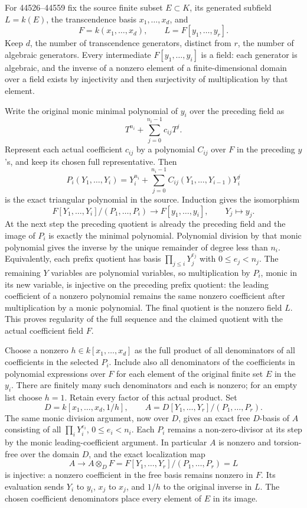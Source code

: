 For 44526--44559 fix the source finite subset \(E\subset K\), its generated subfield \(L=k(E)\), the transcendence basis \(x_1,\ldots,x_d\), and \[
 F=k(x_1,\ldots,x_d),\qquad
 L=F[y_1,\ldots,y_r].
\] Keep \(d\), the number of transcendence generators, distinct from \(r\), the number of algebraic generators. Every intermediate \(F[y_1,\ldots,y_i]\) is a field: each generator is algebraic, and the inverse of a nonzero element of a finite-dimensional domain over a field exists by injectivity and then surjectivity of multiplication by that element.

Write the original monic minimal polynomial of \(y_i\) over the preceding field as \[
 T^{n_i}+\sum_{j=0}^{n_i-1}c_{ij}T^j.
\] Represent each actual coefficient \(c_{ij}\) by a polynomial \(C_{ij}\) over \(F\) in the preceding \(y\)'s, and keep its chosen full representative. Then \[
 P_i(Y_1,\ldots,Y_i)
   =Y_i^{n_i}+\sum_{j=0}^{n_i-1}C_{ij}(Y_1,\ldots,Y_{i-1})Y_i^j
\] is the exact triangular polynomial in the source. Induction gives the isomorphism \[
 F[Y_1,\ldots,Y_i]/(P_1,\ldots,P_i)
       \longrightarrow F[y_1,\ldots,y_i],
 \qquad Y_j\longmapsto y_j.
\] At the next step the preceding quotient is already the preceding field and the image of \(P_i\) is exactly the minimal polynomial. Polynomial division by that monic polynomial gives the inverse by the unique remainder of degree less than \(n_i\). Equivalently, each prefix quotient has basis \(\prod_{j\leq i}Y_j^{e_j}\) with \(0\leq e_j<n_j\). The remaining \(Y\) variables are polynomial variables, so multiplication by \(P_i\), monic in its new variable, is injective on the preceding prefix quotient: the leading coefficient of a nonzero polynomial remains the same nonzero coefficient after multiplication by a monic polynomial. The final quotient is the nonzero field \(L\). This proves regularity of the full sequence and the claimed quotient with the actual coefficient field \(F\).

Choose a nonzero \(h\in k[x_1,\ldots,x_d]\) as the full product of all denominators of all coefficients in the selected \(P_i\). Include also all denominators of the coefficients in polynomial expressions over \(F\) for each element of the original finite set \(E\) in the \(y_i\). There are finitely many such denominators and each is nonzero; for an empty list choose \(h=1\). Retain every factor of this actual product. Set \[
 D=k[x_1,\ldots,x_d,1/h],\qquad
 A=D[Y_1,\ldots,Y_r]/(P_1,\ldots,P_r).
\] The same monic division argument, now over \(D\), gives an exact free \(D\)-basis of \(A\) consisting of all \(\prod_iY_i^{e_i}\), \(0\leq e_i<n_i\). Each \(P_i\) remains a non-zero-divisor at its step by the monic leading-coefficient argument. In particular \(A\) is nonzero and torsion-free over the domain \(D\), and the exact localization map \[
 A\longrightarrow A\otimes_D F
       =F[Y_1,\ldots,Y_r]/(P_1,\ldots,P_r)=L
\] is injective: a nonzero coefficient in the free basis remains nonzero in \(F\). Its evaluation sends \(Y_i\) to \(y_i\), \(x_j\) to \(x_j\), and \(1/h\) to the original inverse in \(L\). The chosen coefficient denominators place every element of \(E\) in its image.

